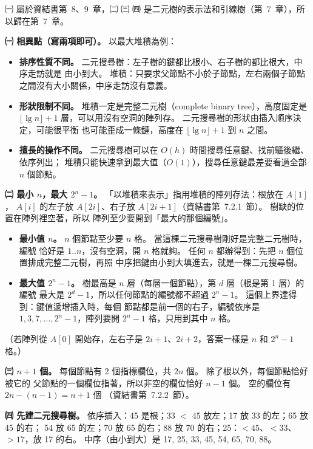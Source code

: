 \begin{pastsoln}
㈠ 屬於資結書第~8、9~章，㈡ ㈢ ㈣ 是二元樹的表示法和引線樹（第~7~章），所以歸在第~7~章。

\textbf{㈠ 相異點（寫兩項即可）。} 以最大堆積為例：
\begin{itemize}
\item \textbf{排序性質不同。} 二元搜尋樹：左子樹的鍵都比根小、右子樹的都比根大，中序走訪就是
由小到大。 堆積：只要求父節點不小於子節點，左右兩個子節點之間沒有大小關係，中序走訪沒有意義。
\item \textbf{形狀限制不同。} 堆積一定是完整二元樹（complete binary tree），高度固定是
$\lfloor \lg n \rfloor + 1$ 層，可以用沒有空洞的陣列存。 二元搜尋樹的形狀由插入順序決定，可能很平衡
也可能歪成一條鏈，高度在 $\lfloor \lg n \rfloor + 1$ 到 $n$ 之間。
\item \textbf{擅長的操作不同。} 二元搜尋樹可以在 $O(h)$ 時間搜尋任意鍵、找前驅後繼、依序列出；
堆積只能快速拿到最大值（$O(1)$），搜尋任意鍵最差要看過全部 $n$ 個節點。
\end{itemize}

\textbf{㈡ 最小 $n$，最大 $2^n - 1$。} 「以堆積來表示」指用堆積的陣列存法：根放在 $A[1]$，
$A[i]$ 的左子放 $A[2i]$、右子放 $A[2i+1]$（資結書第~7.2.1~節）。 樹缺的位置在陣列裡空著，所以
陣列至少要開到「最大的那個編號」。
\begin{itemize}
\item \textbf{最小值 $n$。} $n$ 個節點至少要 $n$ 格。 當這棵二元搜尋樹剛好是完整二元樹時，編號
恰好是 $1..n$，沒有空洞，開 $n$ 格就夠。 任何 $n$ 都辦得到：先把 $n$ 個位置排成完整二元樹，再照
中序把鍵由小到大填進去，就是一棵二元搜尋樹。
\item \textbf{最大值 $2^n - 1$。} 樹最高是 $n$ 層（每層一個節點），第 $d$ 層（根是第 1 層）的編號
最大是 $2^d - 1$，所以任何節點的編號都不超過 $2^n - 1$。 這個上界達得到：鍵值遞增插入時，每個
節點都是前一個的右子，編號依序是 $1, 3, 7, \dots, 2^n - 1$，陣列要開 $2^n - 1$ 格，只用到其中
$n$ 格。
\end{itemize}
（若陣列從 $A[0]$ 開始存，左右子是 $2i+1$、$2i+2$，答案一樣是 $n$ 和 $2^n - 1$ 格。）

\textbf{㈢ $n + 1$ 個。} 每個節點有 2 個指標欄位，共 $2n$ 個。 除了根以外，每個節點恰好被它的
父節點的一個欄位指著，所以非空的欄位恰好 $n - 1$ 個。 空的欄位有 $2n - (n-1) = n + 1$ 個
（資結書第~7.2.2~節）。

\textbf{㈣ 先建二元搜尋樹。} 依序插入：45 是根；33 $<$ 45 放左；17 放 33 的左；65 放 45 的右；
54 放 65 的左；70 放 65 的右；88 放 70 的右；25：$< 45$、$< 33$、$> 17$，放 17 的右。
中序（由小到大）是 17, 25, 33, 45, 54, 65, 70, 88。


\end{pastsoln}
